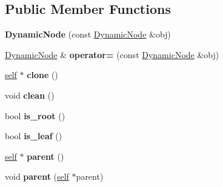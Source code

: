 \subsection*{Public Member Functions}
\begin{DoxyCompactItemize}
\item 
\mbox{\label{classez_1_1trees_1_1DynamicNode_a7ffc014663c9d4a612965fffa80945d6}} 
{\bfseries Dynamic\+Node} (const \hyperlink{classez_1_1trees_1_1DynamicNode}{Dynamic\+Node} \&obj)
\item 
\mbox{\label{classez_1_1trees_1_1DynamicNode_ac22b2d1b0f2c1be60eff3a93e9960cc2}} 
\hyperlink{classez_1_1trees_1_1DynamicNode}{Dynamic\+Node} \& {\bfseries operator=} (const \hyperlink{classez_1_1trees_1_1DynamicNode}{Dynamic\+Node} \&obj)
\item 
\mbox{\label{classez_1_1trees_1_1DynamicNode_a9138f42ed8c80c175116567addaf868e}} 
\hyperlink{classez_1_1trees_1_1DynamicNode}{self} $\ast$ {\bfseries clone} ()
\item 
\mbox{\label{classez_1_1trees_1_1DynamicNode_af1e7a0eeb6ac4df2f8a3a32b89139737}} 
void {\bfseries clean} ()
\item 
\mbox{\label{classez_1_1trees_1_1DynamicNode_adca03f431f8d2582d7640db515bf6f71}} 
bool {\bfseries is\+\_\+root} ()
\item 
\mbox{\label{classez_1_1trees_1_1DynamicNode_ad6944cf15d216c20e9da8e5c031ea4f2}} 
bool {\bfseries is\+\_\+leaf} ()
\item 
\mbox{\label{classez_1_1trees_1_1DynamicNode_a3ec193dde9e1ed1eef9a02cf27ea16d5}} 
\hyperlink{classez_1_1trees_1_1DynamicNode}{self} $\ast$ {\bfseries parent} ()
\item 
\mbox{\label{classez_1_1trees_1_1DynamicNode_a30db00766456f8fc5db216cd5ffbd676}} 
void {\bfseries parent} (\hyperlink{classez_1_1trees_1_1DynamicNode}{self} $\ast$parent)
\item 
\mbox{\label{classez_1_1trees_1_1DynamicNode_aacfcf4064fa5c878934fb56adb1358fb}} 

\end{DoxyCompactItemize}

